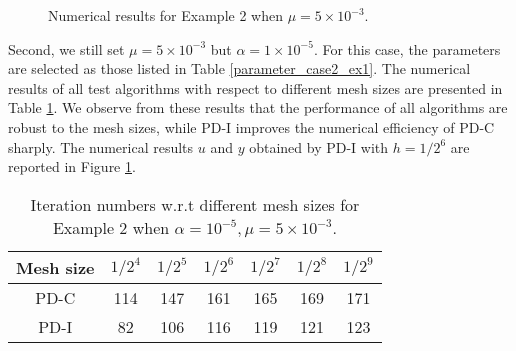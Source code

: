 \documentclass[final]{siamart171218}
\theoremstyle{remark}
\begin{document}
\begin{figure}[h!]
	\caption{ Numerical results for Example 2 when $\mu=5\times10^{-3}$.}\label{numerical_resultu_case1_ex3}
	\centering
\end{figure}



Second, we still set $\mu=5\times10^{-3}$ but $\alpha= 1\times10^{-5}$. For this case, the parameters are selected as those listed in Table \ref{parameter_case2_ex1}. The numerical results of all test algorithms with respect to different mesh sizes are presented in Table \ref{tab:meshindependent2_ex3}. We observe from these results that the performance of all algorithms are robust to the mesh sizes, while PD-I improves the numerical efficiency of PD-C sharply. The numerical results $u$ and $y$ obtained by PD-I with $h={1}/{2^6}$ are reported in Figure \ref{numerical_resultu_case1_ex3}.

\begin{table}[h!]
	\centering
	\caption{Iteration numbers w.r.t  different mesh sizes for Example 2 when $\alpha=10^{-5}, \mu=5\times10^{-3}$.}\label{tab:meshindependent2_ex3}
	{\footnotesize\begin{tabular}{|c|c|c|c|c|c|c|}
			\hline
			Mesh size&$1/{2^4}$&$1/{2^5}$&$1/{2^6}$&$1/{2^7}$&$1/{2^8}$&$1/{2^9}$\\
			\hline
			PD-C&114 &147& 161& 165& 169& 171\\
			\hline
			PD-I&82& 106&116 &119 & 121& 123\\
			\hline
		\end{tabular}
	}
\end{table}
\end{document}

